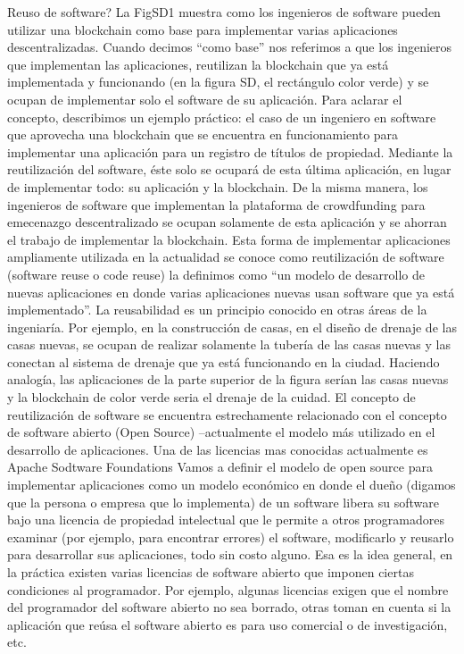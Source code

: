 \documentclass[12pt]{report} %
\begin{document}
Reuso de software?
La FigSD1 muestra como los ingenieros de software pueden utilizar una blockchain como base para implementar varias aplicaciones descentralizadas. Cuando decimos “como base” nos referimos a que los ingenieros que implementan las aplicaciones, reutilizan la blockchain que ya está implementada y funcionando (en la figura SD, el rectángulo color verde) y se ocupan de implementar solo el software de su aplicación. 
Para aclarar el concepto, describimos un ejemplo práctico: el caso de un ingeniero en software que aprovecha una blockchain que se encuentra en funcionamiento para implementar una aplicación para un registro de títulos de propiedad. Mediante la reutilización del software, éste solo se ocupará de esta última aplicación, en lugar de implementar todo: su aplicación y la blockchain. De la misma manera, los ingenieros de software que implementan la plataforma de crowdfunding para emecenazgo descentralizado se ocupan solamente de esta aplicación y se ahorran el trabajo de implementar la blockchain.
Esta forma de implementar aplicaciones ampliamente utilizada en la actualidad se conoce como reutilización de software (software reuse o code reuse) la definimos como “un modelo de desarrollo de nuevas aplicaciones en donde varias aplicaciones nuevas usan software que ya está implementado”. 
La reusabilidad es un principio conocido en otras áreas de la ingeniaría. Por ejemplo, en la construcción de casas, en el diseño de drenaje de las casas nuevas, se ocupan de realizar solamente la tubería de las casas nuevas y las conectan al sistema de drenaje que ya está funcionando en la ciudad. Haciendo analogía, las aplicaciones de la parte superior de la figura serían las casas nuevas y la blockchain de color verde seria el drenaje de la cuidad. 
El concepto de reutilización de software se encuentra estrechamente relacionado con el concepto de software abierto (Open Source) –actualmente el modelo más utilizado en el desarrollo de aplicaciones. Una de las licencias mas conocidas actualmente es Apache Sodtware Foundations  
Vamos a definir el modelo de open source para implementar aplicaciones como un modelo económico en donde el dueño (digamos que la persona o empresa que lo implementa) de un software libera su software bajo una licencia de propiedad intelectual que le permite a otros programadores examinar (por ejemplo, para encontrar errores) el software, modificarlo y reusarlo para desarrollar sus aplicaciones, todo sin costo alguno.  Esa es la idea general, en la práctica existen varias licencias de software abierto que imponen ciertas condiciones al programador. Por ejemplo, algunas licencias exigen que el nombre del programador del software abierto no sea borrado, otras toman en cuenta si la aplicación que reúsa el software abierto es para uso comercial o de investigación, etc. 
\end{document}
